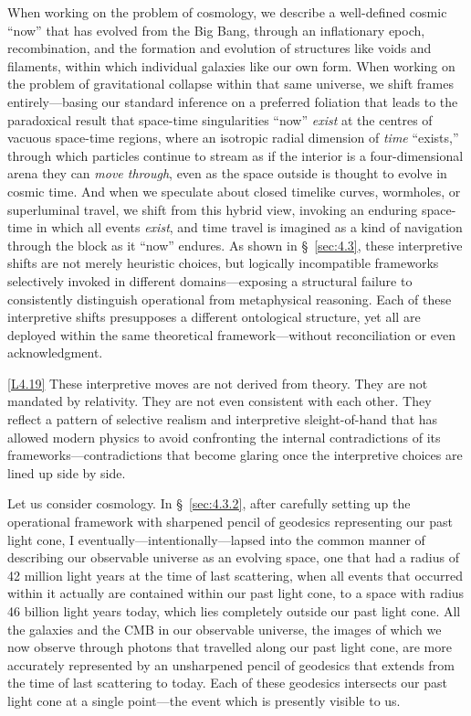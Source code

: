 \documentclass[12pt]{book}
\newcounter{logicanchor}
\newenvironment{logicanchorenv}[1]{\refstepcounter{logicanchor}\label{#1}}{}
\newcommand{\logiclink}[2]{\begin{logicanchorenv}{logic:#1}\end{logicanchorenv}\hyperref[appendix:#1]{[#1]}\xspace}
\begin{document}
\vspace{4pt}

When working on the problem of cosmology, we describe a well-defined cosmic ``now'' that has evolved from the Big Bang, through an inflationary epoch, recombination, and the formation and evolution of structures like voids and filaments, within which individual galaxies like our own form. When working on the problem of gravitational collapse within that same universe, we shift frames entirely---basing our standard inference on a preferred foliation that leads to the paradoxical result that space-time singularities ``now'' \textit{exist} at the centres of vacuous space-time regions, where an isotropic radial dimension of \textit{time} ``exists,'' through which particles continue to stream as if the interior is a four-dimensional arena they can \textit{move through}, even as the space outside is thought to evolve in cosmic time. And when we speculate about closed timelike curves, wormholes, or superluminal travel, we shift from this hybrid view, invoking an enduring space-time in which all events \textit{exist}, and time travel is imagined as a kind of navigation through the block as it ``now'' endures. As shown in \S~\ref{sec:4.3}, these interpretive shifts are not merely heuristic choices, but logically incompatible frameworks selectively invoked in different domains---exposing a structural failure to consistently distinguish operational from metaphysical reasoning. Each of these interpretive shifts presupposes a different ontological structure, yet all are deployed within the same theoretical framework---without reconciliation or even acknowledgment.

\logiclink{L4.19}{} These interpretive moves are not derived from theory. They are not mandated by relativity. They are not even consistent with each other. They reflect a pattern of selective realism and interpretive sleight-of-hand that has allowed modern physics to avoid confronting the internal contradictions of its frameworks---contradictions that become glaring once the interpretive choices are lined up side by side.

Let us consider cosmology. In \S~\ref{sec:4.3.2}, after carefully setting up the operational framework with sharpened pencil of geodesics representing our past light cone, I eventually---intentionally---lapsed into the common manner of describing our observable universe as an evolving space, one that had a radius of 42 million light years at the time of last scattering, when all events that occurred within it actually are contained within our past light cone, to a space with radius 46 billion light years today, which lies completely outside our past light cone. All the galaxies and the CMB in our observable universe, the images of which we now observe  through photons that travelled along our past light cone, are more accurately represented by an unsharpened pencil of geodesics that extends from the time of last scattering to today. Each of these geodesics intersects our past light cone at a single point---the event which is presently visible to us.
\end{document}
